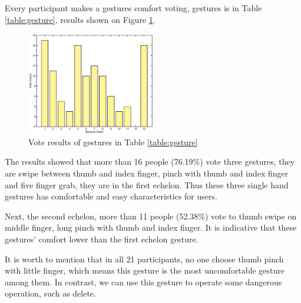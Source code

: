 Every participant makes a gestures comfort voting, gestures is in Table \ref{table:gesture}, results shown on Figure \ref{fig:gesture-vote}.

\begin{figure}[H]
    \kaishu
    \centering
    \includegraphics[width=0.5\textwidth]{figures/gesture-vote}
    \caption{\kaishu Vote results of gestures in Table \ref{table:gesture}}
    \label{fig:gesture-vote}
\end{figure}

The results showed that more than 16 people (76.19\%) vote three gestures, they are swipe between thumb and index finger, pinch with thumb and index finger and five finger grab, they are in the first echelon. Thus these three single hand gestures has comfortable and easy characteristics for users.

Next, the second echelon, more than 11 people (52.38\%) vote to thumb swipe on middle finger, long pinch with thumb and index finger. It is indicative that these gestures' comfort lower than the first echelon gesture.

It is worth to mention that in all 21 participants, no one choose thumb pinch with little finger, which means this gesture is the most uncomfortable gesture among them. In contrast, we can use this gesture to operate some dangerous operation, such as delete.

